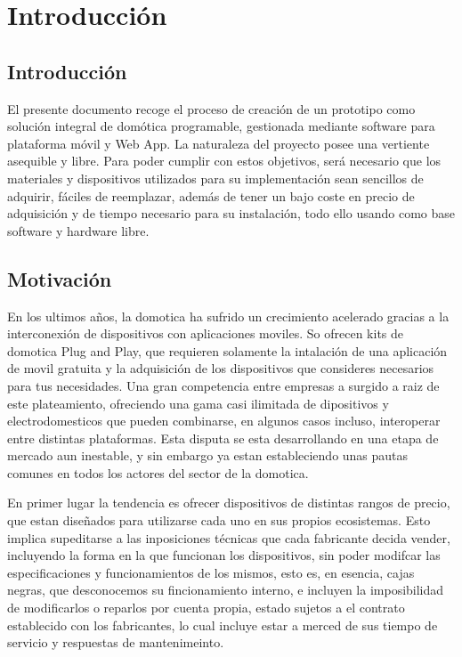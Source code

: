 \cleardoublepage

\chapter{Introducción}

\section{Introducción}
\label{ch:Capitulo1}
El presente documento recoge el proceso de creación de un prototipo como solución integral de domótica programable, gestionada mediante software para plataforma móvil y Web App. La naturaleza del proyecto posee una vertiente asequible y libre. Para poder cumplir con estos objetivos, será necesario que los materiales y dispositivos utilizados para su implementación sean sencillos de adquirir, fáciles de reemplazar, además de tener un bajo coste en precio de adquisición y de tiempo necesario para su instalación, todo ello usando como base software y hardware libre.

\section{Motivación}
\label{ch:Capitulo1.1}


En los ultimos años, la domotica ha sufrido un crecimiento acelerado gracias a la interconexión de dispositivos con aplicaciones moviles. So ofrecen kits de domotica Plug and Play, que requieren solamente la intalación de una aplicación de movil gratuita y la adquisición de los dispositivos que consideres necesarios para tus necesidades. Una gran competencia entre empresas a surgido a raiz de este plateamiento, ofreciendo una gama casi ilimitada de dipositivos y electrodomesticos que pueden combinarse, en algunos casos incluso, interoperar entre distintas plataformas. Esta disputa se esta desarrollando en una etapa de mercado aun inestable, y sin embargo ya estan estableciendo unas pautas comunes en todos los actores del sector de la domotica.

En primer lugar la tendencia es ofrecer dispositivos de distintas rangos de precio, que estan diseñados para utilizarse cada uno en sus propios ecosistemas. Esto implica supeditarse a las inposiciones técnicas que cada fabricante decida vender, incluyendo la forma en la que funcionan los dispositivos, sin poder modifcar las especificaciones y funcionamientos de los mismos, esto es, en esencia, cajas negras, que desconocemos su fincionamiento interno, e incluyen la imposibilidad de modificarlos o reparlos por cuenta propia, estado sujetos a el contrato establecido con los fabricantes, lo cual incluye estar a merced de sus tiempo de servicio y respuestas de mantenimeinto.

